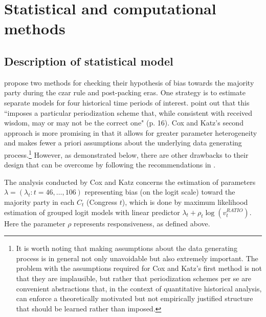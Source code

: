 %

\section{Statistical and computational methods}
\subsection{Description of statistical model}
\label{subsection_methods}

 propose two methods for checking their hypothesis of bias towards the majority party during the czar rule and post-packing eras. One strategy is to estimate separate models for four historical time periods of interest.  point out that this ``imposes a particular periodization scheme that, while consistent with received wisdom, may or may not be the correct one" (p. 16). Cox and Katz's second approach is more promising in that it allows for greater parameter heterogeneity and makes fewer a priori assumptions about the underlying data generating process.\footnote{It is worth noting that making assumptions about the data generating process is in general not only unavoidable but also extremely important. The problem with the assumptions required for Cox and Katz's first method is not that they are implausible, but rather that periodization schemes per se are convenient abstractions that, in the context of quantitative historical analysis, can enforce a theoretically motivated but not empirically justified structure that should be learned rather than imposed.} However, as demonstrated below, there are other drawbacks to their design that can be overcome by following the recommendations in . 

The analysis conducted by Cox and Katz concerns the estimation of parameters  $\lambda = (\lambda_t : t = 46, \dots, 106)$ representing bias (on the logit scale) toward the majority party in each $C_t$ (Congress $t$), which is done by maximum likelihood estimation of grouped logit models with linear predictor $ \lambda_t + \rho_t \log{\left(v_t^{RATIO} \right)}$. Here the parameter $\rho$ represents responsiveness, as defined above. 

